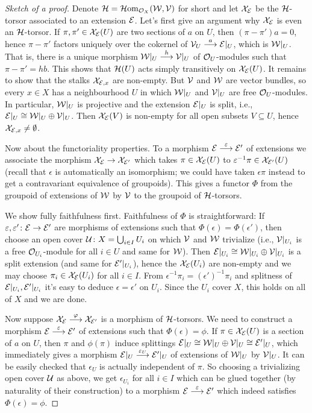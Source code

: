 \documentclass[a4paper,parskip=half,numbers=enddot, DIV=12]{scrreprt}
\begin{document}
\begin{proof}[Sketch of a proof]
	Denote $\mathcal{H}=\operatorname{\mathcal{H} om}_{\mathcal{O}_X}(\mathcal{W},\mathcal{V})$ for short and let $\mathcal{X}_{\mathcal{E}}$ be the $\mathcal{H}$-torsor associated to an extension $\mathcal{E}$. Let's first give an argument why $\mathcal{X}_{\mathcal{E}}$ is even an $\mathcal{H}$-torsor. If $\pi,\pi'\in\mathcal{X}_{\mathcal{E}}(U)$ are two sections of $a$ on $U$, then $(\pi-\pi')a=0$, hence $\pi-\pi'$ factors uniquely over the cokernel of $\Vv_U\morphism[a]\Ee|_U$, which is $\mathcal{W}|_U$. That is, there is a unique morphism $\Ww|_U\morphism[h]\Vv|_U$ of $\mathcal{O}_U$-modules such that $\pi-\pi'=hb$. This shows that $\mathcal{H}(U)$ acts simply transitively on $\mathcal{X}_{\mathcal{E}}(U)$. It remains to show that the stalks $\mathcal{X}_{\mathcal{E},x}$ are non-empty. But $\mathcal{V}$ and $\mathcal{W}$ are vector bundles, so every $x\in X$ has a neighbourhood $U$ in which $\mathcal{W}|_U$ and $\mathcal{V}|_U$ are free $\mathcal{O}_U$-modules. In particular, $\mathcal{W}|_U$ is projective and the extension $\mathcal{E}|_U$ is split, i.e., $\mathcal{E}|_U\cong \mathcal{W}|_U\oplus \mathcal{V}|_U$. Then $\mathcal{X}_{\mathcal{E}}(V)$ is non-empty for all open subsets $V\subseteq U$, hence $\mathcal{X}_{\mathcal{E},x}\neq \emptyset$.
	
	Now about the functoriality properties. To a morphism $\Ee\morphism[\epsilon]\Ee'$ of extensions we associate the morphism $\Xx_\Ee\morphism\Xx_{\Ee'}$ which takes $\pi\in\mathcal{X}_{\mathcal{E}}(U)$ to $\varepsilon^{-1}\pi\in\mathcal{X}_{\mathcal{E}'}(U)$ (recall that $\epsilon$ is automatically an isomorphism; we could have taken $\epsilon\pi$ instead to get a contravariant equivalence of groupoids). This gives a functor $\Phi$ from the groupoid of extensions of $\mathcal{W}$ by $\mathcal{V}$ to the groupoid of $\mathcal{H}$-torsors. 
	
	We show fully faithfulness first. Faithfulness of $\Phi$ is straightforward: If $\epsilon,\epsilon'\colon \Ee\morphism\Ee'$ are morphisms of extensions such that $\Phi(\epsilon)=\Phi(\epsilon')$, then choose an open cover $\mathcal{U}\colon X=\bigcup_{i\in I}U_i$ on which $\mathcal{V}$ and $\mathcal{W}$ trivialize (i.e., $\mathcal{V}|_{U_i}$ is a free $\mathcal{O}_{U_i}$-module for all $i\in U$ and same for $\mathcal{W}$). Then $\mathcal{E}|_{U_i}\cong \mathcal{W}|_{U_i}\oplus \mathcal{V}|_{U_i}$ is a split extension (and same for $\mathcal{E}'|_{U_i}$), hence the $\mathcal{X}_{\mathcal{E}}(U_i)$ are non-empty and we may choose $\pi_i\in \mathcal{X}_{\mathcal{E}}(U_i)$ for all $i\in I$. From $\epsilon^{-1}\pi_i=(\epsilon')^{-1}\pi_i$ and splitness of $\mathcal{E}|_{U_i},\mathcal{E}'|_{U_i}$ it's easy to deduce $\epsilon=\epsilon'$ on $U_i$. Since the $U_i$ cover $X$, this holds on all of $X$ and we are done.
	
	Now suppose $\Xx_\Ee\morphism[\phi]\Xx_{\Ee'}$ is a morphism of $\mathcal{H}$-torsors. We need to construct a morphism $\Ee\morphism[\epsilon]\Ee'$ of extensions such that $\Phi(\epsilon)=\phi$. If $\pi\in\mathcal{X}_{\mathcal{E}}(U)$ is a section of $a$ on $U$, then $\pi$ and $\phi(\pi)$ induce splittings $\mathcal{E}|_U\cong \mathcal{W}|_U\oplus\mathcal{V}|_U\cong \mathcal{E}'|_U$, which immediately gives a morphism $\Ee|_U\morphism[\epsilon_U]\Ee'|_U$ of extensions of $\mathcal{W}|_U$ by $\mathcal{V}|_U$. It can be easily checked that $\epsilon_U$ is actually independent of $\pi$. So choosing a trivializing open cover $\mathcal{U}$ as above, we get $\epsilon_{U_i}$ for all $i\in I$ which can be glued together (by naturality of their construction) to a morphism $\Ee\morphism[\epsilon]\Ee'$ which indeed satisfies $\Phi(\epsilon)=\phi$.
	

\end{proof}
\end{document}
